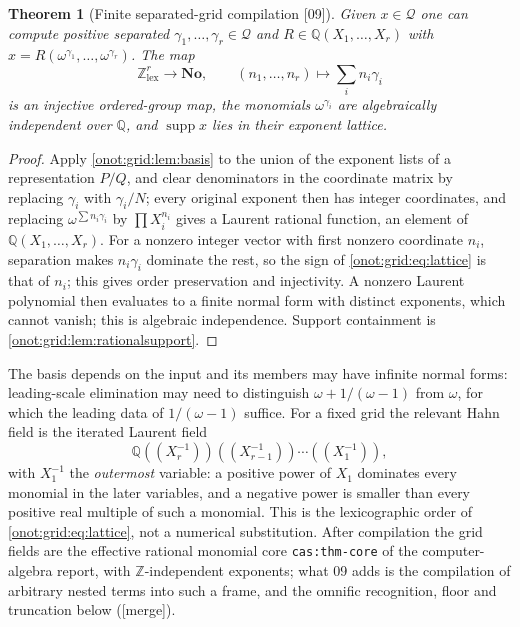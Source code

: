 \documentclass[11pt,oneside]{article}
\numberwithin{equation}{section}
\newtheorem{theorem}{Theorem}[section]
\theoremstyle{definition}
\theoremstyle{remark}
\newcommand{\No}{\mathbf{No}}
\newcommand{\Z}{\mathbb Z}
\newcommand{\Q}{\mathbb Q}
\newcommand{\QO}{\mathcal Q}
\newcommand{\supp}{\operatorname{supp}}
\newcommand{\src}[1]{\textup{\textsf{\small[#1]}}}
\newcommand{\mergetag}{\textup{\textsf{\small[merge]}}}
\newcommand{\replabel}[1]{\nolinkurl{#1}}
\begin{document}
\begin{theorem}[Finite separated-grid compilation \src{09}]\label{onot:grid:thm:grid}
Given $x\in\QO$ one can compute positive separated $\gamma_1,\ldots,\gamma_r\in\QO$
and $R\in\Q(X_1,\ldots,X_r)$ with $x=R(\omega^{\gamma_1},\ldots,\omega^{\gamma_r})$.
The map
\begin{equation}\label{onot:grid:eq:lattice}
 \Z^r_{\mathrm{lex}}\to\No,\qquad(n_1,\ldots,n_r)\mapsto\sum_in_i\gamma_i
\end{equation}
is an injective ordered-group map, the monomials $\omega^{\gamma_i}$ are
algebraically independent over $\Q$, and $\supp x$ lies in their exponent
lattice.
\end{theorem}
\begin{proof}
Apply \cref{onot:grid:lem:basis} to the union of the exponent lists of a
representation $P/Q$, and clear denominators in the coordinate matrix by
replacing $\gamma_i$ with $\gamma_i/N$; every original exponent then has integer
coordinates, and replacing $\omega^{\sum n_i\gamma_i}$ by $\prod X_i^{n_i}$ gives a
Laurent rational function, an element of $\Q(X_1,\ldots,X_r)$. For a nonzero
integer vector with first nonzero coordinate $n_i$, separation makes $n_i\gamma_i$
dominate the rest, so the sign of \eqref{onot:grid:eq:lattice} is that of $n_i$;
this gives order preservation and injectivity. A nonzero Laurent polynomial then
evaluates to a finite normal form with distinct exponents, which cannot vanish;
this is algebraic independence. Support containment is
\cref{onot:grid:lem:rationalsupport}.
\end{proof}

The basis depends on the input and its members may have infinite normal forms:
leading-scale elimination may need to distinguish $\omega+1/(\omega-1)$ from
$\omega$, for which the leading data of $1/(\omega-1)$ suffice. For a fixed grid
the relevant Hahn field is the iterated Laurent field
\begin{equation}\label{onot:grid:eq:iterated}
 \Q((X_r^{-1}))((X_{r-1}^{-1}))\cdots((X_1^{-1})),
\end{equation}
with $X_1^{-1}$ the \emph{outermost} variable: a positive power of $X_1$
dominates every monomial in the later variables, and a negative power is smaller
than every positive real multiple of such a monomial. This is the lexicographic
order of \eqref{onot:grid:eq:lattice}, not a numerical substitution. After
compilation the grid fields are the effective rational monomial core
\replabel{cas:thm-core} of the computer-algebra report, with $\Z$-independent
exponents; what 09 adds is the compilation of arbitrary nested terms into such a
frame, and the omnific recognition, floor and truncation below (\mergetag).
\end{document}
